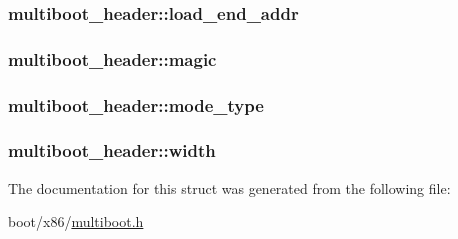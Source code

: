 \subsubsection[{load\+\_\+end\+\_\+addr}]{ multiboot\+\_\+header\+::load\+\_\+end\+\_\+addr}\label{structmultiboot__header_ac9efc1a4c3cd18f286b2fd50ff052e31}
\hypertarget{structmultiboot__header_a7fddee92e60ff58e159c6bf2c40bf29b}{}
\subsubsection[{magic}]{ multiboot\+\_\+header\+::magic}\label{structmultiboot__header_a7fddee92e60ff58e159c6bf2c40bf29b}
\hypertarget{structmultiboot__header_a4c90b7929342dd5aab7d08afa0906d28}{}
\subsubsection[{mode\+\_\+type}]{ multiboot\+\_\+header\+::mode\+\_\+type}\label{structmultiboot__header_a4c90b7929342dd5aab7d08afa0906d28}
\hypertarget{structmultiboot__header_ad72a1a3dd608e73c818d0c27974def40}{}
\subsubsection[{width}]{ multiboot\+\_\+header\+::width}\label{structmultiboot__header_ad72a1a3dd608e73c818d0c27974def40}


The documentation for this struct was generated from the following file\+:\begin{DoxyCompactItemize}
\item 
boot/x86/\hyperlink{multiboot_8h}{multiboot.\+h}\end{DoxyCompactItemize}
